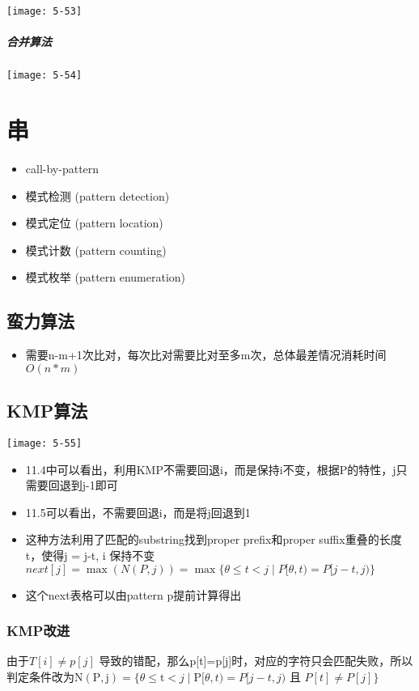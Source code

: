 \texttt{[image: 5-53]}

\paragraph{合并算法}
\texttt{[image: 5-54]}

\chapter{串}
\begin{itemize}
\item call-by-pattern
\item 模式检测 (pattern detection)
\item 模式定位 (pattern location)
\item 模式计数 (pattern counting)
\item 模式枚举 (pattern enumeration)
\end{itemize}

\section{蛮力算法}
\begin{itemize}
\item 需要n-m+1次比对，每次比对需要比对至多m次，总体最差情况消耗时间$O(n*m)$
\end{itemize}

\section{KMP算法}
\texttt{[image: 5-55]}
\begin{itemize}
\item 11.4中可以看出，利用KMP不需要回退i，而是保持i不变，根据P的特性，j只需要回退到j-1即可
\item 11.5可以看出，不需要回退i，而是将j回退到1
\item 这种方法利用了匹配的substring找到proper prefix和proper suffix重叠的长度t，使得j = j-t, i 保持不变\\
$next[j] = \max(N(P, j))=\max\{\theta \leq t<j \mid P[\theta, t)=P[j-t, j)\}$
\item 这个next表格可以由pattern p提前计算得出
\end{itemize}

\subsection{KMP改进}
由于$T[i] \neq p[j]$ 导致的错配，那么p[t]=p[j]时，对应的字符只会匹配失败，所以判定条件改为$\mathrm{N}(\mathrm{P}, \mathrm{j})=\{\theta \leq \mathrm{t}<j \mid \mathrm{P}[\theta, t)=P[j-t, j)$ 且 $P[t] \neq P[j]\}$

